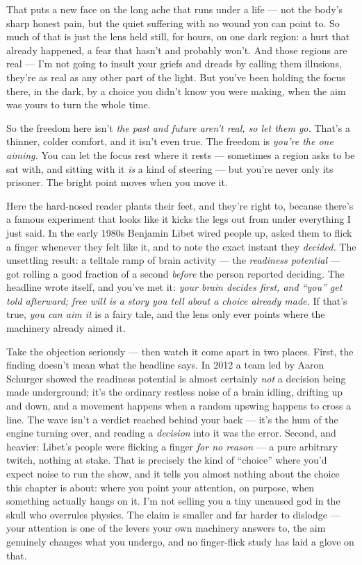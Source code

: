 \documentclass[11pt,openany]{book}
\begin{document}
That puts a new face on the long ache that runs under a life — not the body’s sharp honest pain, but the quiet suffering with no wound you can point to. So much of that is just the lens held still, for hours, on one dark region: a hurt that already happened, a fear that hasn’t and probably won’t. And those regions are real — I’m not going to insult your griefs and dreads by calling them illusions, they’re as real as any other part of the light. But you’ve been holding the focus there, in the dark, by a choice you didn’t know you were making, when the aim was yours to turn the whole time.

So the freedom here isn’t \textit{the past and future aren’t real, so let them go.} That’s a thinner, colder comfort, and it isn’t even true. The freedom is \textit{you’re the one aiming.} You can let the focus rest where it rests — sometimes a region asks to be sat with, and sitting with it \textit{is} a kind of steering — but you’re never only its prisoner. The bright point moves when you move it.

Here the hard-nosed reader plants their feet, and they’re right to, because there’s a famous experiment that looks like it kicks the legs out from under everything I just said. In the early 1980s Benjamin Libet wired people up, asked them to flick a finger whenever they felt like it, and to note the exact instant they \textit{decided.} The unsettling result: a telltale ramp of brain activity — the \textit{readiness potential} — got rolling a good fraction of a second \textit{before} the person reported deciding. The headline wrote itself, and you’ve met it: \textit{your brain decides first, and “you” get told afterward; free will is a story you tell about a choice already made.} If that’s true, \textit{you can aim it} is a fairy tale, and the lens only ever points where the machinery already aimed it.

Take the objection seriously — then watch it come apart in two places. First, the finding doesn’t mean what the headline says. In 2012 a team led by Aaron Schurger showed the readiness potential is almost certainly \textit{not} a decision being made underground; it’s the ordinary restless noise of a brain idling, drifting up and down, and a movement happens when a random upswing happens to cross a line. The wave isn’t a verdict reached behind your back — it’s the hum of the engine turning over, and reading a \textit{decision} into it was the error. Second, and heavier: Libet’s people were flicking a finger \textit{for no reason} — a pure arbitrary twitch, nothing at stake. That is precisely the kind of “choice” where you’d expect noise to run the show, and it tells you almost nothing about the choice this chapter is about: where you point your attention, on purpose, when something actually hangs on it. I’m not selling you a tiny uncaused god in the skull who overrules physics. The claim is smaller and far harder to dislodge — your attention is one of the levers your own machinery answers to, the aim genuinely changes what you undergo, and no finger-flick study has laid a glove on that.
\end{document}
